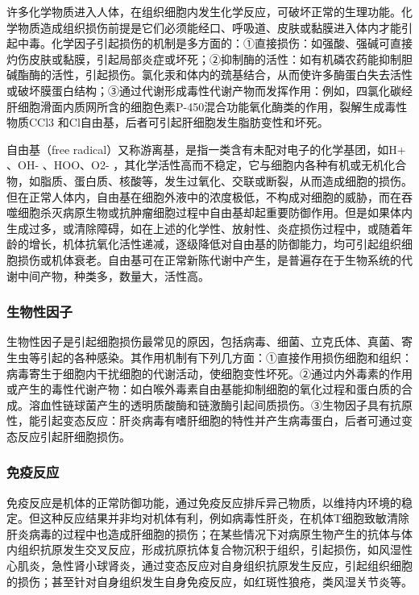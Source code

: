 许多化学物质进入人体，在组织细胞内发生化学反应，可破坏正常的生理功能。化学物质造成组织损伤前提是它们必须能经口、呼吸道、皮肤或黏膜进入体内才能引起中毒。化学因子引起损伤的机制是多方面的：①直接损伤：如强酸、强碱可直接灼伤皮肤或黏膜，引起局部炎症或坏死；②抑制酶的活性：如有机磷农药能抑制胆碱酯酶的活性，引起损伤。氯化汞和体内的巯基结合，从而使许多酶蛋白失去活性或破坏膜蛋白结构；③通过代谢形成毒性代谢产物而发挥作用：例如，四氯化碳经肝细胞滑面内质网所含的细胞色素P-450混合功能氧化酶类的作用，裂解生成毒性物质CCl{3}
和Cl自由基，后者可引起肝细胞发生脂肪变性和坏死。

自由基（free
radical）又称游离基，是指一类含有未配对电子的化学基团，如H{+} 、OH{-}
、HOO、O{2-}
，其化学活性高而不稳定，它与细胞内各种有机或无机化合物，如脂质、蛋白质、核酸等，发生过氧化、交联或断裂，从而造成细胞的损伤。但在正常人体内，自由基在细胞外液中的浓度极低，不构成对细胞的威胁，而在吞噬细胞杀灭病原生物或抗肿瘤细胞过程中自由基却起重要防御作用。但是如果体内生成过多，或清除障碍，如在上述的化学性、放射性、炎症损伤过程中，或随着年龄的增长，机体抗氧化活性递减，逐级降低对自由基的防御能力，均可引起组织细胞损伤或机体衰老。自由基可在正常新陈代谢中产生，是普遍存在于生物系统的代谢中间产物，种类多，数量大，活性高。

\subsubsection{生物性因子}

生物性因子是引起细胞损伤最常见的原因，包括病毒、细菌、立克氏体、真菌、寄生虫等引起的各种感染。其作用机制有下列几方面：①直接作用损伤细胞和组织：病毒寄生于细胞内干扰细胞的代谢活动，使细胞变性坏死。②通过内外毒素的作用或产生的毒性代谢产物：如白喉外毒素自由基能抑制细胞的氧化过程和蛋白质的合成。溶血性链球菌产生的透明质酸酶和链激酶引起间质损伤。③生物因子具有抗原性，能引起变态反应：肝炎病毒有嗜肝细胞的特性并产生病毒蛋白，后者可通过变态反应引起肝细胞损伤。

\subsubsection{免疫反应}

免疫反应是机体的正常防御功能，通过免疫反应排斥异己物质，以维持内环境的稳定。但这种反应结果并非均对机体有利，例如病毒性肝炎，在机体T细胞致敏清除肝炎病毒的过程中也造成肝细胞的损伤；在某些情况下对病原生物产生的抗体与体内组织抗原发生交叉反应，形成抗原抗体复合物沉积于组织，引起损伤，如风湿性心肌炎，急性肾小球肾炎，通过变态反应对自身组织抗原发生反应，引起组织细胞的损伤；甚至针对自身组织发生自身免疫反应，如红斑性狼疮，类风湿关节炎等。

